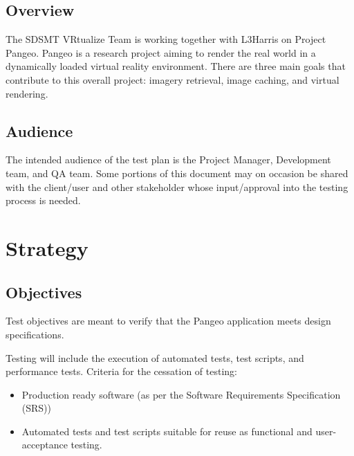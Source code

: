 \documentclass[letterpaper,10pt,english,openany,oneside]{sphinxmanual}
\begin{document}
\section{Overview}
\label{\detokenize{test_plan/intro:overview}}
The SDSMT VRtualize Team is working together with L3Harris on Project Pangeo. Pangeo is a research project aiming to render the real world in a dynamically loaded virtual reality environment. There are three main goals that contribute to this overall project: imagery retrieval, image caching, and virtual rendering.


\section{Audience}
\label{\detokenize{test_plan/intro:audience}}
The intended audience of the test plan is the Project Manager, Development team, and QA team. Some portions of this document may on occasion be shared with the client/user and other stakeholder whose input/approval into the testing process is needed.


\chapter{Strategy}
\label{\detokenize{test_plan/strategy:strategy}}\label{\detokenize{test_plan/strategy:id1}}\label{\detokenize{test_plan/strategy::doc}}

\section{Objectives}
\label{\detokenize{test_plan/strategy:objectives}}
Test objectives are meant to verify that the Pangeo application meets design specifications.

Testing will include the execution of automated tests, test scripts, and performance tests.
Criteria for the cessation of testing:
\begin{itemize}
\item {} 
Production ready  software (as per the Software Requirements Specification (SRS))

\item {} 
Automated tests and test scripts suitable for reuse as functional and user-acceptance testing.

\end{itemize}
\end{document}
